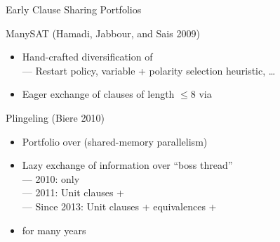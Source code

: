 \documentclass[t,english]{sdqbeamer}
\begin{document}
\begin{frame}{Early Clause Sharing Portfolios}
	
	\begin{blueblock}{ManySAT (Hamadi, Jabbour, and Sais 2009)~\cite{hamadi2010manysat}}
		\begin{itemize}
			\item Hand-crafted diversification of \\
			--- Restart policy, variable + polarity selection heuristic, \ldots
			\item Eager exchange of clauses of length $\leq 8$ via 
		\end{itemize}
	\end{blueblock}
	\pause
	\begin{blueblock}{Plingeling (Biere 2010)~\cite{biere2010lingeling}}
		\begin{itemize}
			\item Portfolio over  (shared-memory parallelism)
			\item Lazy exchange of information over ``boss thread''\\
			--- 2010:  only
			\\
			--- 2011: Unit clauses + 
			\\
			--- Since 2013: Unit clauses + equivalences + 
			\item {} for many years
		\end{itemize}
	\end{blueblock}
\end{frame}
\end{document}

